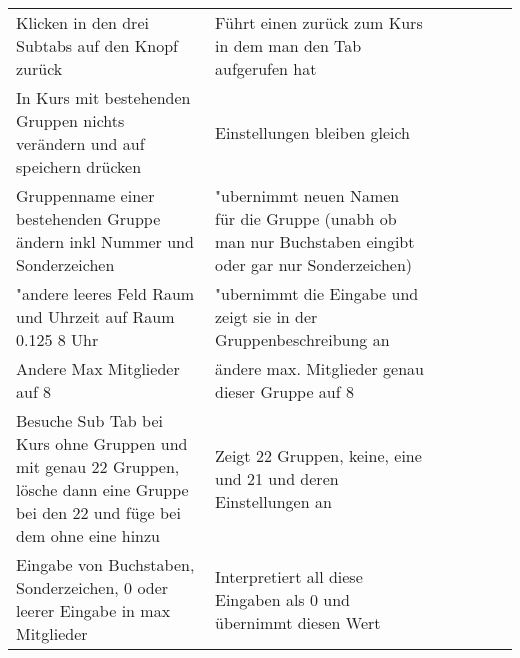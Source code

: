 \begin{table}[]
\begin{tabular}{p{6cm}p{7cm}p{3cm}llll}
		Klicken in den drei Subtabs auf den Knopf zurück                                                                                     & Führt einen zurück zum Kurs in dem man den Tab aufgerufen hat                                                                                                    & \checkmark           &  &  &  \\
		In Kurs mit bestehenden Gruppen nichts verändern und auf speichern drücken                                                            & Einstellungen bleiben gleich                                                                                                                                     & \checkmark           &  &  &  \\
		Gruppenname einer bestehenden Gruppe ändern inkl Nummer und Sonderzeichen                                                      & "ubernimmt neuen Namen für die Gruppe (unabh ob man nur Buchstaben eingibt oder gar nur Sonderzeichen)                                                            & \checkmark           &  &  &  \\
		"andere leeres Feld Raum und Uhrzeit auf Raum 0.125 8 Uhr                                                                           & "ubernimmt die Eingabe und zeigt sie in der Gruppenbeschreibung an                                                                                                & \checkmark           &  &  &  \\
		Andere Max Mitglieder auf 8                                                                                                          & ändere max. Mitglieder genau dieser Gruppe auf 8                                                                                                                 & \checkmark           &  &  &  \\
		Besuche Sub Tab bei Kurs ohne Gruppen und mit genau 22 Gruppen, lösche dann eine Gruppe bei den 22 und füge bei dem ohne eine hinzu & Zeigt 22 Gruppen, keine, eine und 21 und deren Einstellungen an                                                                                                  & \checkmark           &  &  &  \\
		Eingabe von Buchstaben, Sonderzeichen, 0 oder leerer Eingabe  in max Mitglieder                                                      & Interpretiert all diese Eingaben als 0 und übernimmt diesen Wert                                                                                                 & \checkmark           &  &  &  \\

\end{tabular}
\end{table}
